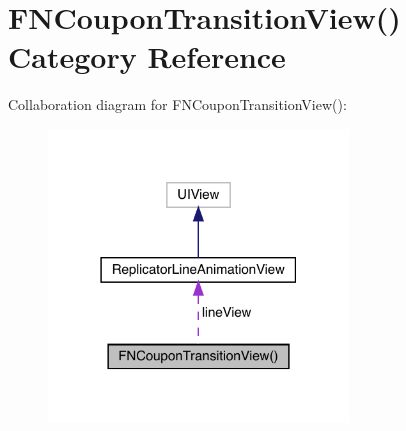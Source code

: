 \hypertarget{category_f_n_coupon_transition_view_07_08}{}\section{F\+N\+Coupon\+Transition\+View() Category Reference}
\label{category_f_n_coupon_transition_view_07_08}


Collaboration diagram for F\+N\+Coupon\+Transition\+View()\+:\nopagebreak
\begin{figure}[H]
\begin{center}
\leavevmode
\includegraphics[width=226pt]{category_f_n_coupon_transition_view_07_08__coll__graph}
\end{center}
\end{figure}
